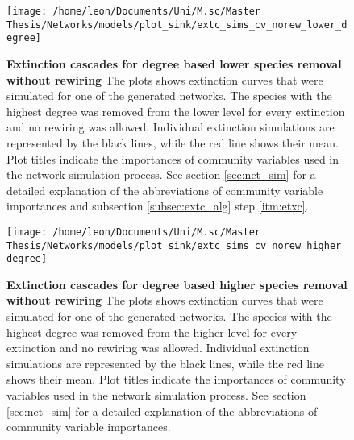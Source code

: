 \documentclass[12pt,a4paper]{article}
\begin{document}
\begin{figure}[H]
	 \centering
	 \texttt{[image: /home/leon/Documents/Uni/M.sc/Master Thesis/Networks/models/plot\_sink/extc\_sims\_cv\_norew\_lower\_degree]}
	 \captionsetup{width = \textwidth}
	 \caption[Extinction cascades for degree based lower species removal without rewiring]{\textbf{Extinction cascades for degree based lower species removal without rewiring} The plots shows extinction curves that were simulated for one of the generated networks. The species with the highest degree was removed from the lower level for every extinction and no rewiring was allowed. Individual extinction simulations are represented by the black lines, while the red line shows their mean. Plot titles indicate the importances of community variables used in the network simulation process. See section \ref{sec:net_sim} for a detailed explanation of the abbreviations of community variable importances and subsection \ref{subsec:extc_alg} step \ref{itm:etxc}.}
	 \label{fig:extc_cv_norew_lower_deg}
\end{figure}


\begin{figure}[H]
	 \centering
	 \texttt{[image: /home/leon/Documents/Uni/M.sc/Master Thesis/Networks/models/plot\_sink/extc\_sims\_cv\_norew\_higher\_degree]}
	 \captionsetup{width = \textwidth}
	 \caption[Extinction cascades for degree based higher species removal without rewiring]{\textbf{Extinction cascades for degree based higher species removal without rewiring} The plots shows extinction curves that were simulated for one of the generated networks. The species with the highest degree was removed from the higher level for every extinction and no rewiring was allowed. Individual extinction simulations are represented by the black lines, while the red line shows their mean. Plot titles indicate the importances of community variables used in the network simulation process. See section \ref{sec:net_sim} for a detailed explanation of the abbreviations of community variable importances.}
	 \label{fig:extc_cv_norew_higher_deg}
\end{figure}
\end{document}

